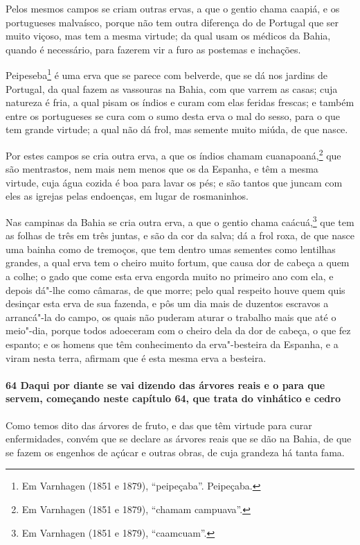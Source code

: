 Pelos mesmos campos se criam outras ervas, a que o gentio chama caapiá, e os portugueses
malvaísco, porque não tem outra diferença do de Portugal que ser muito viçoso, mas tem a
mesma virtude; da qual usam os médicos da Bahia, quando é necessário, para fazerem vir a
furo as postemas e inchações.

Peipeseba\footnote{ Em Varnhagen (1851 e 1879), ``peipeçaba''. Peipeçaba.} é uma erva que
se parece com belverde, que se dá nos jardins de Portugal, da qual fazem as vassouras na
Bahia, com que varrem as casas; cuja natureza é fria, a qual pisam os índios e curam com
elas feridas frescas; e também entre os portugueses se cura com o sumo desta erva o mal do
sesso, para o que tem grande virtude; a qual não dá frol, mas semente muito miúda, de que
nasce.

Por estes campos se cria outra erva, a que os índios chamam cuanapoaná,\footnote{ Em
Varnhagen (1851 e 1879), ``chamam campuava''.} que são mentrastos, nem mais nem menos que
os da Espanha, e têm a mesma virtude, cuja água cozida é boa para lavar os pés; e são
tantos que juncam com eles as igrejas pelas endoenças, em lugar de rosmaninhos.

Nas campinas da Bahia se cria outra erva, a que o gentio chama caácuá,\footnote{ Em
Varnhagen (1851 e 1879), ``caamcuam''.} que tem as folhas de três em três juntas, e são da
cor da salva; dá a frol roxa, de que nasce uma bainha como de tremoços, que tem dentro
umas sementes como lentilhas grandes, a qual erva tem o cheiro muito fortum, que causa dor
de cabeça a quem a colhe; o gado que come esta erva engorda muito no primeiro ano com ela,
e depois dá"-lhe como câmaras, de que morre; pelo qual respeito houve quem quis desinçar
esta erva de sua fazenda, e pôs um dia mais de duzentos escravos a arrancá"-la do campo, os
quais não puderam aturar o trabalho mais que até o meio"-dia, porque todos adoeceram com o
cheiro dela da dor de cabeça, o que fez espanto; e os homens que têm conhecimento da
erva"-besteira da Espanha, e a viram nesta terra, afirmam que é esta mesma erva a besteira.

\paragraph{64 Daqui por diante se vai dizendo das árvores reais e o para que servem,
começando neste capítulo 64, que trata do vinhático e cedro}

Como temos dito das árvores de fruto, e das que têm virtude para curar enfermidades,
convém que se declare as árvores reais que se dão na Bahia, de que se fazem os engenhos de
açúcar e outras obras, de cuja grandeza há tanta fama.

